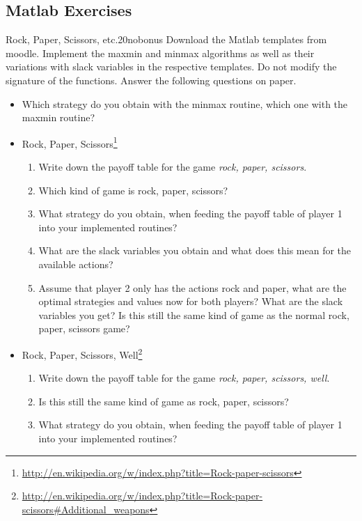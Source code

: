 \documentclass[twoside,english,colorbacktitle,accentcolor=tud9c,10pt]{tudexercise}
\begin{document}

\subsection{Matlab Exercises}

\begin{questions}

\begin{question}{Rock, Paper, Scissors, etc.}{20}{nobonus}
	Download the Matlab templates from moodle. Implement the maxmin and minmax algorithms as well as their variations with slack variables in the respective templates. Do not modify the signature of the functions. Answer the following questions on paper.
	\begin{itemize}
		\item Which strategy do you obtain with the minmax routine, which one with the maxmin routine?
		\item Rock, Paper, Scissors\footnote{\url{http://en.wikipedia.org/w/index.php?title=Rock-paper-scissors}}
		\begin{enumerate}
			\item Write down the payoff table for the game \emph{rock, paper, scissors}.
			\item Which kind of game is rock, paper, scissors?
			\item What strategy do you obtain, when feeding the payoff table of player 1 into your implemented routines?
			\item What are the slack variables you obtain and what does this mean for the available actions?
			\item Assume that player 2 only has the actions rock and paper, what are the optimal strategies and values now for both players? What are the slack variables you get? Is this still the same kind of game as the normal rock, paper, scissors game?
		\end{enumerate}
		\item Rock, Paper, Scissors, Well\footnote{\url{http://en.wikipedia.org/w/index.php?title=Rock-paper-scissors\#Additional\_weapons}}
		\begin{enumerate}
			\item Write down the payoff table for the game \emph{rock, paper, scissors, well}.
			\item Is this still the same kind of game as rock, paper, scissors?
			\item What strategy do you obtain, when feeding the payoff table of player 1 into your implemented routines?

\end{enumerate}
\end{itemize}
\end{question}
\end{questions}
\end{document}
